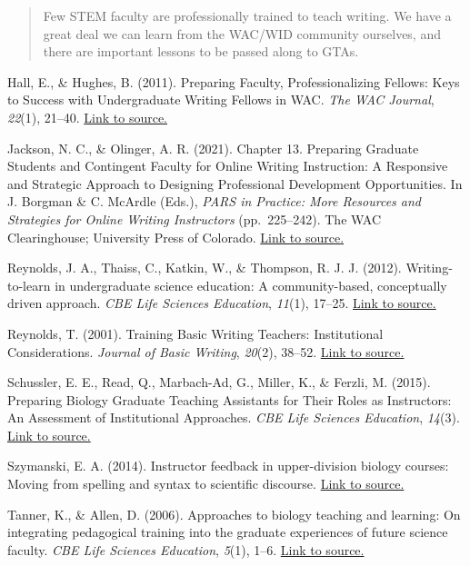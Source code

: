 \documentclass[
]{book}
\begin{document}
\begin{quote}
Few STEM faculty are professionally trained to teach writing. We have a great deal we can learn from the WAC/WID community ourselves, and there are important lessons to be passed along to GTAs.
\end{quote}

Hall, E., \& Hughes, B. (2011). Preparing Faculty, Professionalizing Fellows: Keys to Success with Undergraduate Writing Fellows in WAC. \emph{The WAC Journal}, \emph{22}(1), 21--40. \href{https://doi.org/10.37514/WAC-J.2011.22.1.03}{Link to source.}

Jackson, N. C., \& Olinger, A. R. (2021). Chapter 13. Preparing Graduate Students and Contingent Faculty for Online Writing Instruction: A Responsive and Strategic Approach to Designing Professional Development Opportunities. In J. Borgman \& C. McArdle (Eds.), \emph{PARS in Practice: More Resources and Strategies for Online Writing Instructors} (pp.~225--242). The WAC Clearinghouse; University Press of Colorado. \href{https://doi.org/10.37514/PRA-B.2021.1145.2.13}{Link to source.}

Reynolds, J. A., Thaiss, C., Katkin, W., \& Thompson, R. J. J. (2012). Writing-to-learn in undergraduate science education: A community-based, conceptually driven approach. \emph{CBE Life Sciences Education}, \emph{11}(1), 17--25. \href{https://doi.org/10.1187/cbe.11-08-0064}{Link to source.}

Reynolds, T. (2001). Training Basic Writing Teachers: Institutional Considerations. \emph{Journal of Basic Writing}, \emph{20}(2), 38--52. \href{https://doi.org/10.37514/JBW-J.2001.20.2.05}{Link to source.}

Schussler, E. E., Read, Q., Marbach-Ad, G., Miller, K., \& Ferzli, M. (2015). Preparing Biology Graduate Teaching Assistants for Their Roles as Instructors: An Assessment of Institutional Approaches. \emph{CBE Life Sciences Education}, \emph{14}(3). \href{https://doi.org/10.1187/cbe.14-11-0196}{Link to source.}

Szymanski, E. A. (2014). Instructor feedback in upper-division biology courses: Moving from spelling and syntax to scientific discourse. \href{http://wac.colostate.edu/atd/articles/szymanski2014.cfm}{Link to source.}

Tanner, K., \& Allen, D. (2006). Approaches to biology teaching and learning: On integrating pedagogical training into the graduate experiences of future science faculty. \emph{CBE Life Sciences Education}, \emph{5}(1), 1--6. \href{https://doi.org/10.1187/cbe.05-12-0132}{Link to source.}
\end{document}
